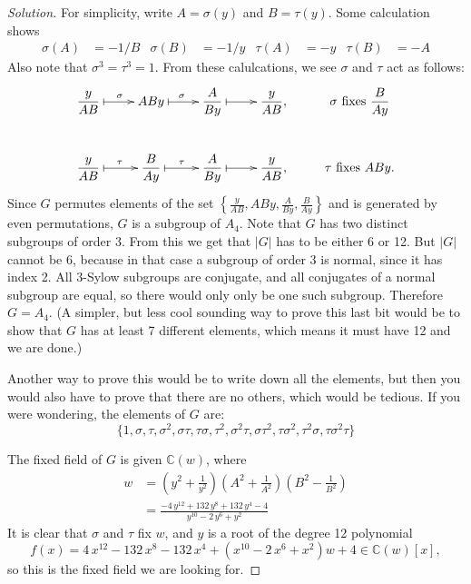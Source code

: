 \documentclass{article}
\newcommand{\C}{\mathbb C}
\begin{document}
\begin{proof}[Solution]
For simplicity, write $A=\sigma(y)$ and $B=\tau(y)$. Some calculation
shows
\begin{align*}
\sigma(A)&=-1/B & \sigma(B)&=-1/y &
\tau(A)&=-y & \tau(B)&=-A
\end{align*}
Also note that $\sigma^3=\tau^3=1$.
From these calulcations, we see $\sigma$ and $\tau$ act as follows:
\newcommand{\ds}{\displaystyle}
\begin{equation*}
\xymatrix{
  \ds\frac{y}{AB} \ar@{|->}[r]^{\sigma}
    & ABy      \ar@{|->}[r]^{\sigma}
    & \ds\frac{A}{By} \ar@{|->}[r]
    & \ds\frac{y}{AB},
    & \sigma\text{ fixes }\ds\frac{B}{Ay}\\
  \ds\frac{y}{AB} \ar@{|->}[r]^{\tau}
    & \ds\frac{B}{Ay}    \ar@{|->}[r]^{\tau}
    & \ds\frac{A}{By} \ar@{|->}[r]
   & \ds\frac{y}{AB},
    & \tau\text{ fixes }ABy.
}
\end{equation*}
Since $G$ permutes elements of the set
$\ds\left\{\frac{y}{AB},ABy,\frac{A}{By},\frac{B}{Ay}\right\}$ and is
generated by even permutations, $G$ is a subgroup of $A_4$. Note that
$G$ has two distinct subgroups of order 3. From this we get that $|G|$
has to be either 6 or 12. But $|G|$ cannot be 6, because in that case
a subgroup of order 3 is normal, since it has index 2.
All 3-Sylow subgroups are conjugate, and all conjugates of a 
normal subgroup are equal, so there would only only be one such subgroup.
Therefore $G=A_4$. (A simpler, but less cool sounding way to prove
this last bit would be to show that $G$ has at least 7 different
elements, which means it must 
have 12 and we are done.)

Another way to prove this would be to write down all the elements, but
then you would also have to prove that there are no others, which
would be tedious. If you were wondering, the elements of $G$ are:
$$\{1,\sigma,\tau,\sigma^2,\sigma\tau,\tau\sigma,\tau^2,\sigma^2\tau
     ,\sigma\tau^2,\tau\sigma^2,\tau^2\sigma,\tau\sigma^2\tau\}$$

	 The fixed field of $G$ is given $\C(w)$, where
\begin{align*}
w&=\left(y^2+\frac{1}{y^2}\right)\left(A^2+\frac{1}{A^2}\right)
\left(B^2-\frac{1}{B^2}\right)\\
&= {\frac {-4\,{y}^{12}+132\,{y}^{8}+132\,{y}^{4}-4}{{y}^{10}-2\,{y}^{6}+
{y}^{2}}}
\end{align*}
It is clear that $\sigma$ and $\tau$ fix $w$, and $y$ is a root of the
degree 12 polynomial
$$f(x)=4\,{x}^{12}-132\,{x}^{8}-132\,{x}^{4}+ \left( {x}^{10}-2\,{x}^{6}+{x}^
{2} \right) w+4\in\C(w)[x],$$
so this is the fixed field we are looking for.
\end{proof}
\end{document}
